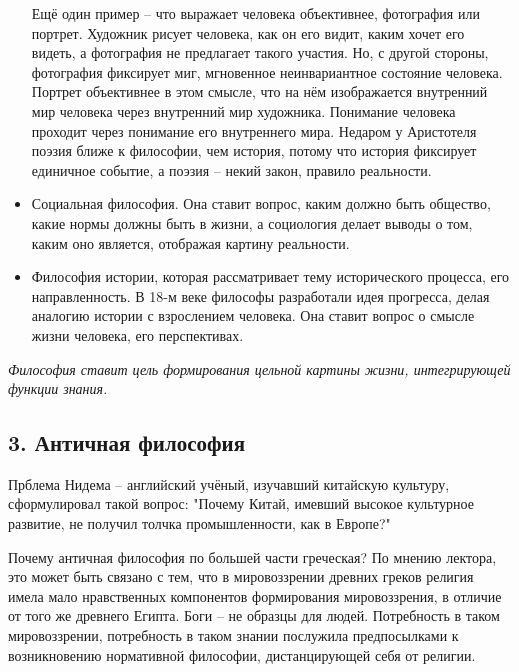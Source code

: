 \documentclass[a4paper, 12pt]{article} %
\begin{document}
\begin{itemize}
Ещё один пример -- что выражает человека объективнее, фотография или портрет. Художник рисует человека, как он его видит, каким хочет его видеть, а фотография не предлагает такого участия. Но, с другой стороны, фотография фиксирует миг, мгновенное неинвариантное состояние человека. Портрет объективнее в этом смысле, что на нём изображается внутренний мир человека через внутренний мир художника. Понимание человека проходит через понимание его внутреннего мира. Недаром у Аристотеля поэзия ближе к философии, чем история, потому что история фиксирует единичное событие, а поэзия -- некий закон, правило реальности.

\item Социальная философия. Она ставит вопрос, каким должно быть общество, какие нормы должны быть в жизни, а социология делает выводы о том, каким оно является, отображая картину реальности. 

\item Философия истории, которая рассматривает тему исторического процесса, его направленность. В 18-м веке философы разработали идея прогресса, делая аналогию истории с взрослением человека. Она ставит вопрос о смысле жизни человека, его перспективах.
 	 
\end{itemize}
\textit{Философия ставит цель формирования цельной картины жизни, интегрирующей функции знания.}

\subsection*{3. Античная философия}

Прблема Нидема -- английский учёный, изучавший китайскую культуру, сформулировал такой вопрос: "Почему Китай, имевший высокое культурное развитие, не получил толчка промышленности, как в Европе?" 

Почему античная философия по большей части греческая? По мнению лектора, это может быть связано с тем, что в мировоззрении древних греков религия имела мало нравственных компонентов формирования мировоззрения, в отличие от того же древнего Египта. Боги -- не образцы для людей. Потребность в таком мировоззрении, потребность в таком знании послужила предпосылками к возникновению нормативной философии, дистанцирующей себя от религии.
\end{document}
